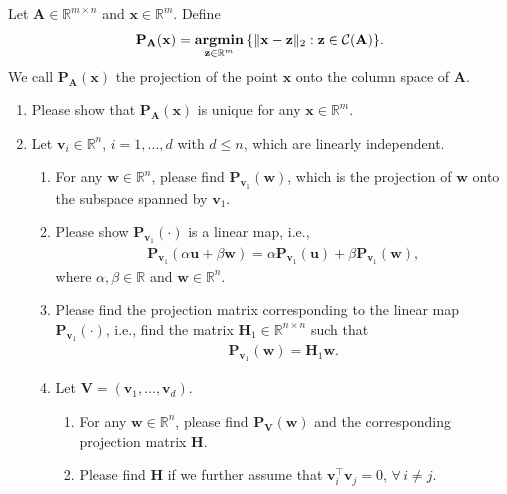 \documentclass[11pt,letter,notitlepage]{article}
\DeclareMathOperator*{\argmin}{\bf argmin}
\newcommand{\proj}[2]{\textbf{P}_{#2} (#1)}
\theoremstyle{definition}
\begin{document}
\newpage	
	\begin{exercise}[Projection ]
		Let $\mathbf{A}\in\mathbb{R}^{m\times n}$ and $\mathbf{x} \in \mathbb{R}^m$. Define
		\begin{align*}
			\proj{\mathbf{x}}{\mathbf{A}} = \argmin_{\mathbf{z}\in\mathbb{R}^m}\,\{\|\mathbf{x}-\mathbf{z}\|_2: \mathbf{z}\in\mathcal{C}(\mathbf{A})\}.   
		\end{align*}
		We call $\proj{\mathbf{x}}{\mathbf{A}}$ the projection of the point $\mathbf{x}$ onto the column space of $\mathbf{A}$. 
		\begin{enumerate}
			\item Please show that $\mathbf{P}_{\mathbf{A}}(\mathbf{x})$ is unique for any $\mathbf{x} \in \mathbb{R}^m$. 
			\item Let $\mathbf{v}_i \in \mathbb{R}^n$, $i=1,\ldots,d$ with $d\leq n$, which are linearly independent.
			\begin{enumerate}
				\item For any $\mathbf{w}\in \mathbb{R}^n$, please find $\proj{\mathbf{w}}{\mathbf{v}_1}$, which is the projection of $\mathbf{w}$ onto the subspace spanned by $\mathbf{v}_1$.  
				\item Please show $\proj{\cdot}{\mathbf{v}_1}$ is a linear map, i.e.,
				\begin{align*}
					\proj{\alpha\mathbf{u}+\beta\mathbf{w}}{\mathbf{v}_1}=\alpha\proj{\mathbf{u}}{\mathbf{v}_1} + \beta \proj{\mathbf{w}}{\mathbf{v}_1},
				\end{align*}
				where $\alpha,\beta\in\mathbb{R}$ and $\mathbf{w}\in\mathbb{R}^n$.
				\item Please find the projection matrix corresponding to the linear map $\proj{\cdot}{\mathbf{v}_1}$, i.e., find the matrix $\mathbf{H}_1\in\mathbb{R}^{n\times n}$ such that
				\begin{align*}
					\proj{\mathbf{w}}{\mathbf{v}_1}=\mathbf{H}_1\mathbf{w}.
				\end{align*}
				\item Let $\mathbf{V}=(\mathbf{v}_1,\ldots,\mathbf{v}_d)$. 
				\begin{enumerate}
					\item For any $\mathbf{w}\in \mathbb{R}^n$, please find $\proj{\mathbf{w}}{\mathbf{V}}$ and the corresponding projection matrix $\mathbf{H}$.
					\item Please find $\mathbf{H}$ if we further assume that $\mathbf{v}_i^{\top}\mathbf{v}_j=0$, $\forall\,i\neq j$.
				\end{enumerate}
			\end{enumerate}
			

\end{enumerate}
\end{exercise}
\end{document}
